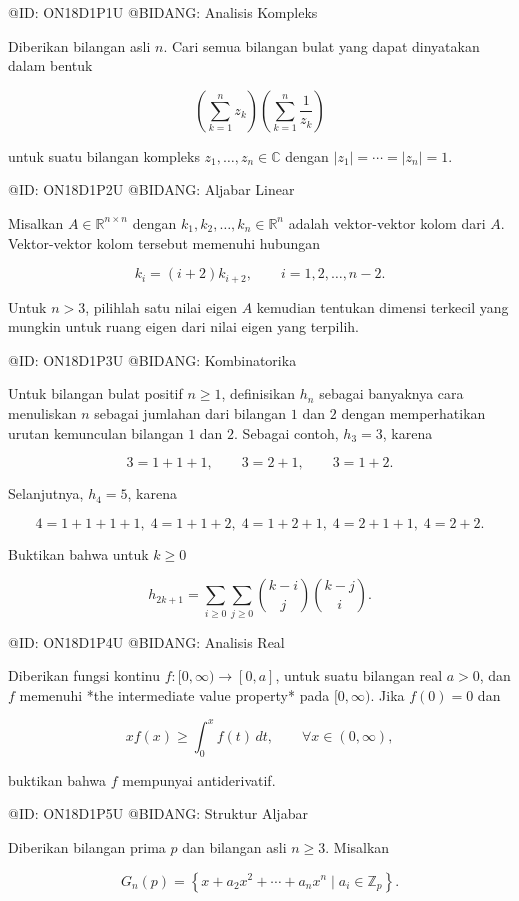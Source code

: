 @ID: ON18D1P1U
@BIDANG: Analisis Kompleks




Diberikan bilangan asli $n$. Cari semua bilangan bulat yang dapat dinyatakan dalam bentuk

$$
\left(\sum_{k=1}^{n} z_k\right)
\left(\sum_{k=1}^{n}\frac1{z_k}\right)
$$

untuk suatu bilangan kompleks $z_1,\dots,z_n\in\mathbb C$ dengan $|z_1|=\cdots=|z_n|=1$.

@ID: ON18D1P2U
@BIDANG: Aljabar Linear

Misalkan $A\in\mathbb R^{n\times n}$ dengan $k_1,k_2,\dots,k_n\in\mathbb R^n$ adalah vektor-vektor kolom dari $A$. Vektor-vektor kolom tersebut memenuhi hubungan

$$
k_i=(i+2)k_{i+2},\qquad i=1,2,\dots,n-2.
$$

Untuk $n>3$, pilihlah satu nilai eigen $A$ kemudian tentukan dimensi terkecil yang mungkin untuk ruang eigen dari nilai eigen yang terpilih.

@ID: ON18D1P3U
@BIDANG: Kombinatorika

Untuk bilangan bulat positif $n\ge1$, definisikan $h_n$ sebagai banyaknya cara menuliskan $n$ sebagai jumlahan dari bilangan $1$ dan $2$ dengan memperhatikan urutan kemunculan bilangan $1$ dan $2$. Sebagai contoh, $h_3=3$, karena

$$
3=1+1+1,\qquad
3=2+1,\qquad
3=1+2.
$$

Selanjutnya, $h_4=5$, karena

$$
4=1+1+1+1,\;
4=1+1+2,\;
4=1+2+1,\;
4=2+1+1,\;
4=2+2.
$$

Buktikan bahwa untuk $k\ge0$

$$
h_{2k+1}
=
\sum_{i\ge0}\sum_{j\ge0}
\binom{k-i}{j}
\binom{k-j}{i}.
$$

@ID: ON18D1P4U
@BIDANG: Analisis Real

Diberikan fungsi kontinu $f:[0,\infty)\to[0,a]$, untuk suatu bilangan real $a>0$, dan $f$ memenuhi *the intermediate value property* pada $[0,\infty)$. Jika $f(0)=0$ dan

$$
xf(x)\ge\int_0^x f(t)\,dt,\qquad \forall x\in(0,\infty),
$$

buktikan bahwa $f$ mempunyai antiderivatif.

@ID: ON18D1P5U
@BIDANG: Struktur Aljabar

Diberikan bilangan prima $p$ dan bilangan asli $n\ge3$. Misalkan

$$
G_n(p)=
\left\{
x+a_2x^2+\cdots+a_nx^n
\mid
a_i\in\mathbb Z_p
\right\}.
$$

